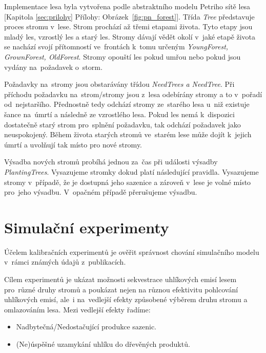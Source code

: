 \documentclass[a4paper, 11pt, titlepage]{article}
\begin{document}
Implementace lesa byla vytvořena podle abstraktního modelu Petriho sítě lesa [Kapitola \ref{sec:prilohy} Přílohy: Obrázek~\ref{fig:pn_forest}].
Třída \textit{Tree} představuje proces stromu v~lese. Strom prochází až třemi etapami života. Tyto etapy jsou mladý les, vzrostlý les a starý les. Stromy dávají vědět okolí v~jaké etapě života se nachází svojí přítomností ve~frontách k~tomu určeným \textit{YoungForest, GrownForest, OldForest}. 
Stromy opouští les pokud umřou nebo pokud jsou vydány na~požadavek o~storm. 

Požadavky na~stromy jsou obstarávány třídou \textit{NeedTrees a NeedTree}. Při příchodu požadavku na~strom/stromy jsou z~lesa odebírány stromy a to v~pořadí od~nejstaršího. Přednostně tedy odchází stromy ze~starého lesa u~niž existuje šance na~úmrtí a následně ze vzrostlého lesa. Pokud les nemá k~dispozici dostatečně starý strom pro~splnění požadavku, tak odchází požadavek jako neuspokojený.
Během života starých stromů ve~starém lese může dojít k~jejich úmrtí a uvolňují tak místo pro nové stromy.

Výsadba nových stromů probíhá jednou za~čas při události výsadby \textit{PlantingTrees}. Vysazujeme stromky dokud platí následující pravidla. Vysazujeme stromy v~případě, že je dostupná jeho sazenice a zároveň v~lese je volné místo pro~jeho výsadbu. V~opačném případě přerušujeme výsadbu.  



\newpage
\section{Simulační experimenty} \label{sec:simulacni_experimenty}

Účelem kalibračních experimentů je ověřit správnost chování simulačního modelu v~rámci známých údajů z~publikacích.

Cílem experimentů je ukázat možnosti sekvestrace uhlíkových emisí lesem pro~různé druhy stromů a poukázat nejen na různou efektivitu pohlcování uhlíkových emisí, ale~i na~vedlejší efekty způsobené výběrem druhu stromu a omlazováním lesa. Mezi vedlejší efekty řadíme:
\begin{itemize}
    \item Nadbytečná/Nedostačující produkce sazenic.
    \item (Ne)úspěšné uzamykání uhlíku do dřevěných produktů.
\end{itemize}
\end{document}
